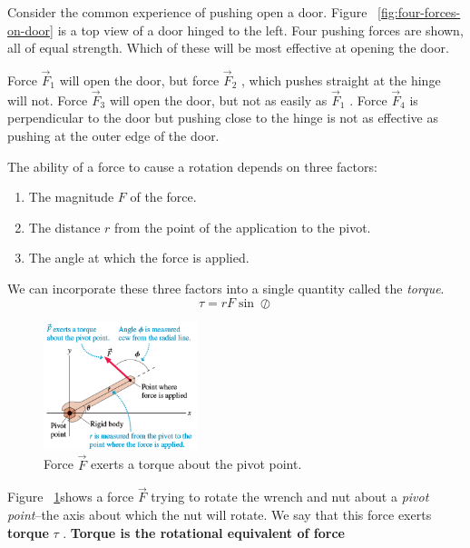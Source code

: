 Consider the common experience of pushing open a door.  Figure~%
\ref{fig:four-forces-on-door} is a top view of a door hinged to the
left.  Four pushing forces are shown, all of equal strength.  Which of
these will be most effective at opening the door.

Force
$
    \vec{F}_1
$ will open the door, but force
$
    \vec{F}_2
$%
, which pushes straight at the hinge will not.  Force
$
    \vec{F}_3
$ will open the door, but not as easily as
$
    \vec{F}_1
$%
.  Force
$
    \vec{F}_4
$ is perpendicular to the door but pushing close to the hinge is not as
effective as pushing at the outer edge of the door.

The ability of a force to cause a rotation depends on three factors:
\begin{enumerate}
    \item
        The magnitude
        $
            F
        $ of the force.
    \item
        The distance
        $
            r
        $ from the point of the application to the pivot.
    \item
        The angle at which the force is applied.
\end{enumerate}

We can incorporate these three factors into a single quantity called the
\emph{torque}.
\begin{equation}
    \tau = r F\sin{\oslash}
\end{equation}

\begin{figure}
    \centering
    \includegraphics[width=0.4\textwidth]{../figures/torque-diagram.png}
    \caption{Force
    $
        \vec{F}
    $ exerts a torque about the pivot point.}%
    \label{fig:torque-diagram}
\end{figure}

Figure~%
\ref{fig:torque-diagram}shows a force
$
    \vec{F}
$ trying to rotate the wrench and nut about a \emph{pivot point}--the
axis about which the nut will rotate.  We say that this force exerts
\textbf{torque}
$
    \tau
$%
.  \textbf{Torque is the rotational equivalent of force}

